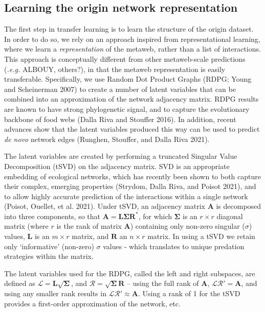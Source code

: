 \documentclass[11pt]{article}
\begin{document}
\hypertarget{learning-the-origin-network-representation}{%
\subsection{Learning the origin network
representation}\label{learning-the-origin-network-representation}}

The first step in transfer learning is to learn the structure of the
origin dataset. In order to do so, we rely on an approach inspired from
representational learning, where we learn a \emph{representation} of the
metaweb, rather than a list of interactions. This approach is
conceptually different from other metaweb-scale predictions
(\emph{.e.g.} ALBOUY, others?), in that the metaweb representation is
easily transferable. Specifically, we use Random Dot Product Graphs
(RDPG; Young and Scheinerman 2007) to create a number of latent
variables that can be combined into an approximation of the network
adjacency matrix. RDPG results are known to have strong phylogenetic
signal, and to capture the evolutionary backbone of food webs (Dalla
Riva and Stouffer 2016). In addition, recent advances show that the
latent variables produced this way can be used to predict \emph{de novo}
network edges (Runghen, Stouffer, and Dalla Riva 2021).

The latent variables are created by performing a truncated Singular
Value Decomposition (tSVD) on the adjacency matrix. SVD is an
appropriate embedding of ecological networks, which has recently been
shown to both capture their complex, emerging properties (Strydom, Dalla
Riva, and Poisot 2021), and to allow highly accurate prediction of the
interactions within a single network (Poisot, Ouellet, et al. 2021).
Under tSVD, an adjacency matrix \(\mathbf{A}\) is decomposed into three
components, so that
\(\mathbf{A} = \mathbf{L}\mathbf{\Sigma}\mathbf{R}^*\), for which
\(\mathbf{\Sigma}\) is an \(r \times r\) diagonal matrix (where \(r\) is
the rank of matrix \(\mathbf{A}\)) containing only non-zero singular
(\(\sigma\)) values, \(\mathbf{L}\) is an \(m \times r\) matrix, and
\(\mathbf{R}\) an \(n \times r\) matrix. In using a tSVD we retain only
`informative' (non-zero) \(\sigma\) values - which translates to unique
predation strategies within the matrix.

The latent variables used for the RDPG, called the left and right
subspaces, are defined as
\(\mathcal{L} = \mathbf{L}\sqrt{\mathbf{\Sigma}}\), and
\(\mathcal{R} = \sqrt{\mathbf{\Sigma}}\mathbf{R}\) -- using the full
rank of \(\mathbf{A}\), \(\mathcal{L}\mathcal{R}' = \mathbf{A}\), and
using any smaller rank results in
\(\mathcal{L}\mathcal{R}' \approx \mathbf{A}\). Using a rank of 1 for
the tSVD provides a first-order approximation of the network, etc.
\end{document}
